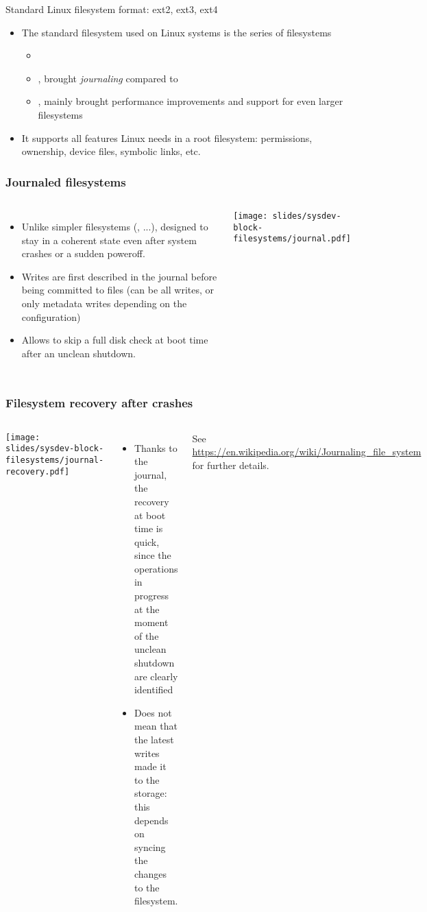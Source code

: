 \begin{frame}{Standard Linux filesystem format: ext2, ext3, ext4}
  \begin{itemize}
  \item The standard filesystem used on Linux systems is the series of
     filesystems
    \begin{itemize}
    \item {}
    \item {}, brought {\em journaling} compared to 
    \item {}, mainly brought performance improvements and
      support for even larger filesystems
    \end{itemize}
  \item It supports all features Linux needs in a root filesystem:
    permissions, ownership, device files, symbolic links, etc.
  \end{itemize}
\end{frame}

\begin{frame}
  \frametitle{Journaled filesystems}
  \begin{columns}
    \begin{itemize}
    \item Unlike simpler filesystems (, ...),
      designed to stay in a coherent state even after system
      crashes or a sudden poweroff.
    \item Writes are first described in the journal before being
      committed to files (can be all writes, or only metadata writes
      depending on the configuration)
    \item Allows to skip a full disk check at boot time after an
      unclean shutdown.
    \end{itemize}
    \texttt{[image: slides/sysdev-block-filesystems/journal.pdf]}
  \end{columns}
\end{frame}

\begin{frame}
  \frametitle{Filesystem recovery after crashes}
  \begin{columns}
    \texttt{[image: slides/sysdev-block-filesystems/journal-recovery.pdf]}
    \begin{itemize}
    \item Thanks to the journal, the recovery at boot time is quick,
      since the operations in progress at the moment of the unclean
      shutdown are clearly identified
    \item Does not mean that the latest writes made it to the storage:
      this depends on syncing the changes to the filesystem.
    \end{itemize}
    See \url{https://en.wikipedia.org/wiki/Journaling_file_system}
    for further details.
  \end{columns}
\end{frame}

